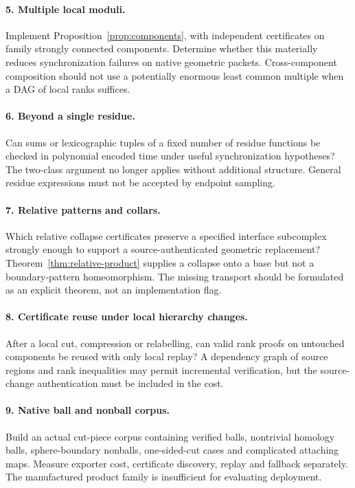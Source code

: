 \documentclass[11pt,letterpaper]{article}
\theoremstyle{definition}
\theoremstyle{remark}\newtheorem{remark}[theorem]{Remark}
\begin{document}
\paragraph{5. Multiple local moduli.}
Implement Proposition~\ref{prop:components}, with independent certificates on family strongly connected components. Determine whether this materially reduces synchronization failures on native geometric packets. Cross-component composition should not use a potentially enormous least common multiple when a DAG of local ranks suffices.

\paragraph{6. Beyond a single residue.}
Can sums or lexicographic tuples of a fixed number of residue functions be checked in polynomial encoded time under useful synchronization hypotheses? The two-class argument no longer applies without additional structure. General residue expressions must not be accepted by endpoint sampling.

\paragraph{7. Relative patterns and collars.}
Which relative collapse certificates preserve a specified interface subcomplex strongly enough to support a source-authenticated geometric replacement? Theorem~\ref{thm:relative-product} supplies a collapse onto a base but not a boundary-pattern homeomorphism. The missing transport should be formulated as an explicit theorem, not an implementation flag.

\paragraph{8. Certificate reuse under local hierarchy changes.}
After a local cut, compression or relabelling, can valid rank proofs on untouched components be reused with only local replay? A dependency graph of source regions and rank inequalities may permit incremental verification, but the source-change authentication must be included in the cost.

\paragraph{9. Native ball and nonball corpus.}
Build an actual cut-piece corpus containing verified balls, nontrivial homology balls, sphere-boundary nonballs, one-sided-cut cases and complicated attaching maps. Measure exporter cost, certificate discovery, replay and fallback separately. The manufactured product family is insufficient for evaluating deployment.
\end{document}
